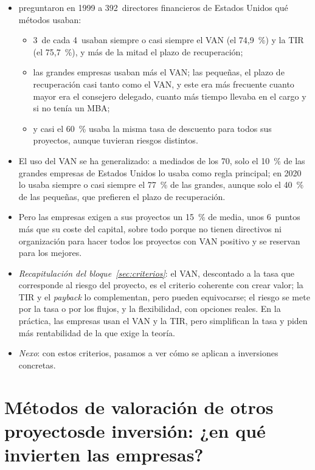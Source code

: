 \documentclass[11pt]{article}
\begin{document}
\begin{itemize}
\item \textcite{GrahamHarvey2001Theory} preguntaron en 1999 a 392~directores financieros de Estados Unidos qué métodos usaban:
  \begin{itemize}
  \item 3~de cada 4~usaban siempre o casi siempre el VAN (el 74,9~\%) y la TIR (el 75,7~\%), y más de la mitad el plazo de recuperación;
  \item las grandes empresas usaban más el VAN; las pequeñas, el plazo de recuperación casi tanto como el VAN, y este era más frecuente cuanto mayor era el consejero delegado, cuanto más tiempo llevaba en el cargo y si no tenía un MBA;
  \item y casi el 60~\% usaba la misma tasa de descuento para todos sus proyectos, aunque tuvieran riesgos distintos\nocite{GrahamHarvey2002How}.
  \end{itemize}
\item El uso del VAN se ha generalizado: a mediados de los 70, solo el 10~\% de las grandes empresas de Estados Unidos lo usaba como regla principal\nocite{GitmanForrester1977Survey}; en 2020 lo usaba siempre o casi siempre el 77~\% de las grandes, aunque solo el 40~\% de las pequeñas, que prefieren el plazo de recuperación\nocite{Graham2022Presidential}.
\item Pero las empresas exigen a sus proyectos un 15~\% de media, unos 6~puntos más que su coste del capital\nocite{Graham2022Presidential}, sobre todo porque no tienen directivos ni organización para hacer todos los proyectos con VAN positivo y se reservan para los mejores\nocite{JagannathanEtAl2016Why}.
\item \emph{Recapitulación del bloque~\ref{sec:criterios}}: el VAN, descontado a la tasa que corresponde al riesgo del proyecto, es el criterio coherente con crear valor; la TIR y el \emph{payback} lo complementan, pero pueden equivocarse; el riesgo se mete por la tasa o por los flujos, y la flexibilidad, con opciones reales. En la práctica, las empresas usan el VAN y la TIR, pero simplifican la tasa y piden más rentabilidad de la que exige la teoría.
\item \emph{Nexo}: con estos criterios, pasamos a ver cómo se aplican a inversiones concretas.
\end{itemize}

\section{Métodos de valoración de otros proyectos\newline de inversión: ¿en qué invierten las empresas?}\label{sec:otros-proyectos}
\end{document}

